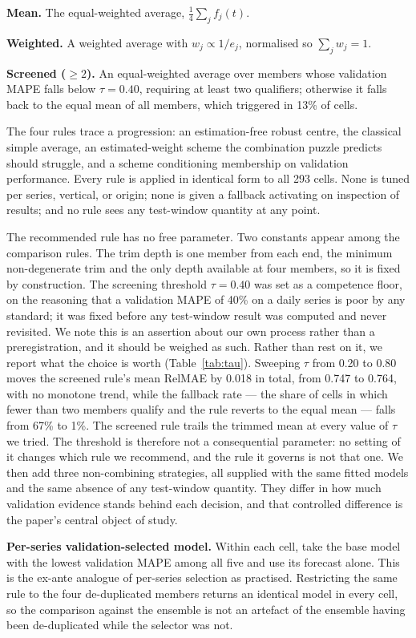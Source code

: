 \documentclass[11pt]{article}
\begin{document}
\textbf{Mean.} The equal-weighted average, $\tfrac{1}{4}\sum_j f_j(t)$.

\textbf{Weighted.} A weighted average with $w_j \propto 1/e_j$, normalised so $\sum_j w_j = 1$.

\textbf{Screened ($\geq 2$).} An equal-weighted average over members whose validation MAPE falls below $\tau = 0.40$, requiring at least two qualifiers; otherwise it falls back to the equal mean of all members, which triggered in 13\% of cells.

The four rules trace a progression: an estimation-free robust centre, the classical simple average, an estimated-weight scheme the combination puzzle predicts should struggle, and a scheme conditioning membership on validation performance. Every rule is applied in identical form to all 293 cells. None is tuned per series, vertical, or origin; none is given a fallback activating on inspection of results; and no rule sees any test-window quantity at any point.

The recommended rule has no free parameter. Two constants appear among the comparison rules. The trim depth is one member from each end, the minimum non-degenerate trim and the only depth available at four members, so it is fixed by construction. The screening threshold $\tau = 0.40$ was set as a competence floor, on the reasoning that a validation MAPE of 40\% on a daily series is poor by any standard; it was fixed before any test-window result was computed and never revisited. We note this is an assertion about our own process rather than a preregistration, and it should be weighed as such. Rather than rest on it, we report what the choice is worth (Table~\ref{tab:tau}). Sweeping $\tau$ from 0.20 to 0.80 moves the screened rule's mean RelMAE by 0.018 in total, from 0.747 to 0.764, with no monotone trend, while the fallback rate --- the share of cells in which fewer than two members qualify and the rule reverts to the equal mean --- falls from 67\% to 1\%. The screened rule trails the trimmed mean at every value of $\tau$ we tried. The threshold is therefore not a consequential parameter: no setting of it changes which rule we recommend, and the rule it governs is not that one.
We then add three non-combining strategies, all supplied with the same fitted models and the same absence of any test-window quantity. They differ in how much validation evidence stands behind each decision, and that controlled difference is the paper's central object of study.

\textbf{Per-series validation-selected model.} Within each cell, take the base model with the lowest validation MAPE among all five and use its forecast alone. This is the ex-ante analogue of per-series selection as practised. Restricting the same rule to the four de-duplicated members returns an identical model in every cell, so the comparison against the ensemble is not an artefact of the ensemble having been de-duplicated while the selector was not.
\end{document}
